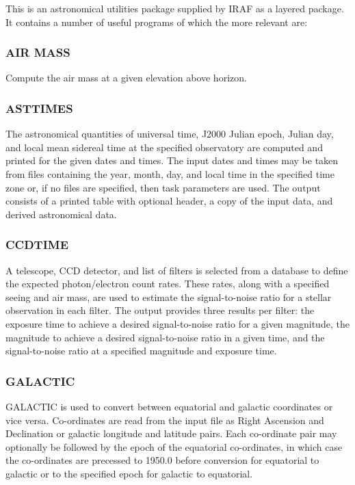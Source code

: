 \documentclass[twoside,11pt]{article}
\newcommand{\htmladdnormallink}[2]{#1}
\newcommand{\xlabel}[1]{}
\newcommand{\IRAFref}{\htmladdnormallink{IRAF}{http://star-www.rl.ac.uk/iraf/}}
\begin{document}
This is an astronomical utilities package supplied by {\IRAFref} 
as a layered package. It contains a number of useful programs of which the more
relevant are: 

\subsubsection{AIR MASS} 

Compute the air mass at a given elevation above horizon.

\subsubsection{ASTTIMES}

The astronomical quantities of universal time, J2000 Julian epoch, Julian
day, and local mean sidereal time at the specified observatory are computed
and printed for the given dates and times. The input dates and times may be
taken from files containing the year, month, day, and local time in the
specified time zone or, if no files are specified, then task parameters are
used.  The output consists of a printed table with optional header, a copy of
the input data, and derived astronomical data.  

\subsubsection{CCDTIME} \xlabel{CCDTIME}
\label{sec:ccdtime} 

A telescope, CCD detector, and list of filters is selected from a database to
define the expected photon/electron count rates.  These rates, along with a
specified seeing and air mass, are used to estimate the signal-to-noise ratio
for a stellar observation in each filter.  The output provides three
results per filter: the exposure time to achieve a desired signal-to-noise 
ratio for a given magnitude, the magnitude to achieve a desired 
signal-to-noise ratio in a given time, and the signal-to-noise ratio 
at a specified magnitude and exposure time. 
    
\subsubsection{GALACTIC} \xlabel{GALACTIC}
\label{sec:galactic} 
 
GALACTIC is used to convert between equatorial and galactic coordinates or
vice versa. Co-ordinates are read from the input file as Right Ascension and Declination or
galactic longitude and latitude pairs. Each co-ordinate pair may optionally be
followed by the epoch of the equatorial co-ordinates, in which case the
co-ordinates are precessed to 1950.0 before conversion for equatorial to
galactic or to the specified epoch for galactic to equatorial. 
    
\end{document}
